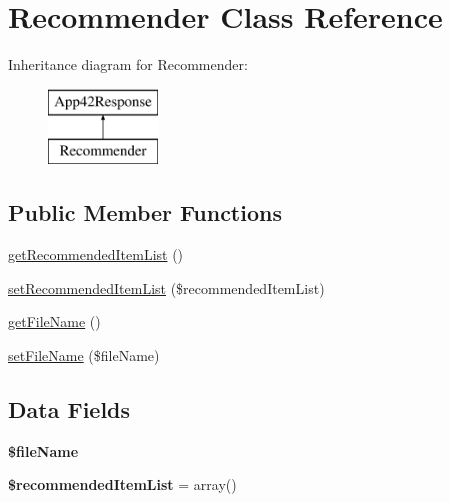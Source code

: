 \hypertarget{class_recommender}{\section{Recommender Class Reference}
\label{class_recommender}
}
Inheritance diagram for Recommender\+:\begin{figure}[H]
\begin{center}
\leavevmode
\includegraphics[height=2.000000cm]{class_recommender}
\end{center}
\end{figure}
\subsection*{Public Member Functions}
\begin{DoxyCompactItemize}
\item 
\hyperlink{class_recommender_a603ff6a580a024d149ce71d32a6b2d58}{get\+Recommended\+Item\+List} ()
\item 
\hyperlink{class_recommender_afdf119233cfe2f2830b65f6375ab2cd7}{set\+Recommended\+Item\+List} (\$recommended\+Item\+List)
\item 
\hyperlink{class_recommender_afdeebfe3fcf5806fc79c074a6a3a6eb1}{get\+File\+Name} ()
\item 
\hyperlink{class_recommender_a85dd368290dba8a3e2da6c58a83c1d15}{set\+File\+Name} (\$file\+Name)
\end{DoxyCompactItemize}
\subsection*{Data Fields}
\begin{DoxyCompactItemize}
\item 
\hypertarget{class_recommender_a68fbc5a9273a24181c50a057d11603fa}{{\bfseries \$file\+Name}}\label{class_recommender_a68fbc5a9273a24181c50a057d11603fa}

\item 
\hypertarget{class_recommender_ae05ab61c038bc9ceb6aaa9cae2ddf5d4}{{\bfseries \$recommended\+Item\+List} = array()}\label{class_recommender_ae05ab61c038bc9ceb6aaa9cae2ddf5d4}

\end{DoxyCompactItemize}


